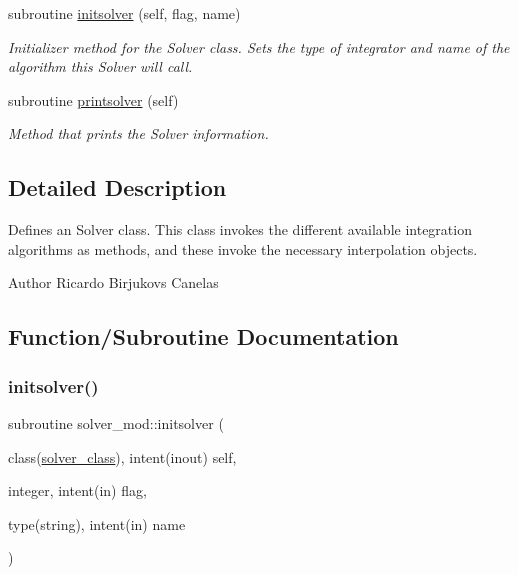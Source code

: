\begin{DoxyCompactItemize}
subroutine \mbox{\hyperlink{namespacesolver__mod_a326292ff19880a914317109520b200b2}{initsolver}} (self, flag, name)
\begin{DoxyCompactList}\small\item\em Initializer method for the Solver class. Sets the type of integrator and name of the algorithm this Solver will call. \end{DoxyCompactList}\item 
subroutine \mbox{\hyperlink{namespacesolver__mod_a54ea6899cce026a7a5da2dd05922628f}{printsolver}} (self)
\begin{DoxyCompactList}\small\item\em Method that prints the Solver information. \end{DoxyCompactList}\end{DoxyCompactItemize}


\subsection{Detailed Description}
Defines an Solver class. This class invokes the different available integration algorithms as methods, and these invoke the necessary interpolation objects. 

\begin{DoxyAuthor}{Author}
Ricardo Birjukovs Canelas 
\end{DoxyAuthor}


\subsection{Function/\+Subroutine Documentation}
\mbox{\label{namespacesolver__mod_a326292ff19880a914317109520b200b2}} 
\subsubsection{\texorpdfstring{initsolver()}{initsolver()}}
{\footnotesize\ttfamily subroutine solver\+\_\+mod\+::initsolver (\begin{DoxyParamCaption}\item[{class(\mbox{\hyperlink{structsolver__mod_1_1solver__class}{solver\+\_\+class}}), intent(inout)}]{self,  }\item[{integer, intent(in)}]{flag,  }\item[{type(string), intent(in)}]{name }\end{DoxyParamCaption})\hspace{0.3cm}{\ttfamily [private]}}



